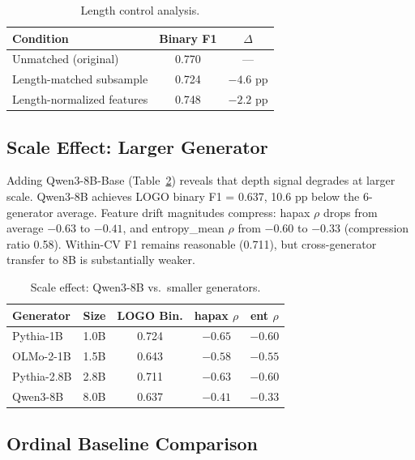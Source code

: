 \documentclass[11pt]{article}
\begin{document}
\begin{table}[t]
\centering
\small
\caption{Length control analysis.}
\label{tab:length}
\begin{tabular}{lcc}
\toprule
\textbf{Condition} & \textbf{Binary F1} & \textbf{$\Delta$} \\
\midrule
Unmatched (original) & 0.770 & --- \\
Length-matched subsample & 0.724 & $-4.6$ pp \\
Length-normalized features & 0.748 & $-2.2$ pp \\
\bottomrule
\end{tabular}
\end{table}

\subsection{Scale Effect: Larger Generator}
\label{sec:scale}

Adding Qwen3-8B-Base (Table~\ref{tab:scale}) reveals that depth signal degrades at larger scale. Qwen3-8B achieves LOGO binary F1 = 0.637, 10.6 pp below the 6-generator average. Feature drift magnitudes compress: hapax $\rho$ drops from average $-0.63$ to $-0.41$, and entropy\_mean $\rho$ from $-0.60$ to $-0.33$ (compression ratio 0.58). Within-CV F1 remains reasonable (0.711), but cross-generator transfer to 8B is substantially weaker.

\begin{table}[t]
\centering
\small
\caption{Scale effect: Qwen3-8B vs.\ smaller generators.}
\label{tab:scale}
\begin{tabular}{lcccc}
\toprule
\textbf{Generator} & \textbf{Size} & \textbf{LOGO Bin.} & \textbf{hapax $\rho$} & \textbf{ent $\rho$} \\
\midrule
Pythia-1B & 1.0B & 0.724 & $-0.65$ & $-0.60$ \\
OLMo-2-1B & 1.5B & 0.643 & $-0.58$ & $-0.55$ \\
Pythia-2.8B & 2.8B & 0.711 & $-0.63$ & $-0.60$ \\
Qwen3-8B & 8.0B & 0.637 & $-0.41$ & $-0.33$ \\
\bottomrule
\end{tabular}
\end{table}

\subsection{Ordinal Baseline Comparison}
\label{sec:baselines}
\end{document}
